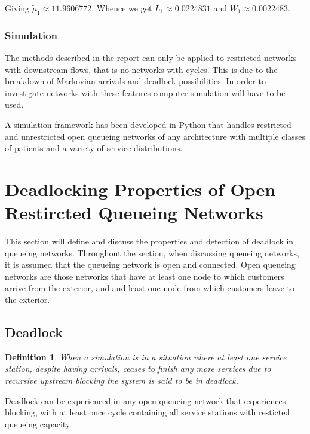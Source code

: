 \documentclass{article}
\newtheorem{definition}{Definition}
\begin{document}
Giving $\tilde{\mu}_1 \approx 11.9606772$.
Whence we get $L_1 \approx 0.0224831$ and $W_1 \approx 0.0022483$.


\subsubsection{Simulation}
The methods described in the report can only be applied to restricted networks with downstream flows, that is no networks with cycles.
This is due to the breakdown of Markovian arrivals and deadlock possibilities.
In order to investigate networks with these features computer simulation will have to be used.

A simulation framework has been developed in Python that handles restricted and unrestricted open queueing networks of any architecture with multiple classes of patients and a variety of service distributions.



\section{Deadlocking Properties of Open Restircted Queueing Networks}

This section will define and discuss the properties and detection of deadlock in queueing networks.
Throughout the section, when discussing queueing networks, it is assumed that
the queueing network is open and connected.
Open queueing networks are those networks that have at least one node to which customers arrive from the exterior, and and least one node from which customers leave to the exterior.

\subsection{Deadlock}

\begin{definition}
    When a simulation is in a situation where at least one service station,
    despite having arrivals, ceases to finish any more services
    due to recursive upstream blocking the system is said to be in deadlock.
\end{definition}

Deadlock can be experienced in any open queueing network that experiences
blocking, with at least once cycle containing all service stations with
resticted queueing capacity.
\end{document}
